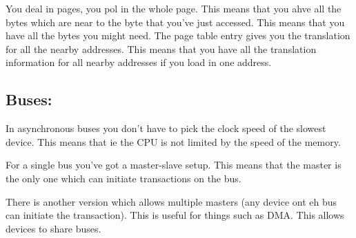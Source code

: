 \documentclass[10pt,\jkfside,a4paper]{article}
\begin{document}
You deal in pages, you pol in the whole page. This means that you ahve all the bytes which are 
near to the byte that you've just accessed. This means that you have all the bytes you might 
need. The page table entry gives you the translation for all the nearby addresses. This means 
that you have all the translation information for all nearby addresses if you load in one address.

\subsection*{Buses:}

In asynchronous buses you don't have to pick the clock speed of the slowest device. 
This means that ie the CPU is not limited by the speed of the memory.

For a single bus you've got a master-slave setup. This means that the master is the only one which 
can initiate transactions on the bus.

There is another version which allows multiple masters (any device ont eh bus can initiate 
the transaction). This is useful for things such as DMA. This allows devices to share buses. 
\end{document}

